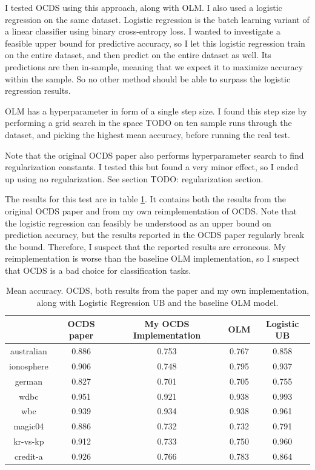 I tested OCDS using this approach, along with OLM. I also used a logistic
regression on the same dataset. Logistic regression is the batch learning
variant of a linear classifier using binary cross-entropy loss. I wanted to
investigate a feasible upper bound for predictive accuracy, so I let this
logistic regression train on the entire dataset, and then predict on the entire
dataset as well. Its predictions are then in-sample, meaning that we expect it
to maximize accuracy within the sample. So no other method should be able to
surpass the logistic regression results.

OLM has a hyperparameter in form of a single step size. I found this step size
by performing a grid search in the space TODO on ten sample runs through the
dataset, and picking the highest mean accuracy, before running the real test.

Note that the original OCDS paper also performs hyperparameter search to find regularization constants. I tested this but found a very minor effect, so I ended up using no regularization. See section TODO: regularization section.

The results for this test are in table \ref{tab:OCDS results}. It contains both
the results from the original OCDS paper and from my own reimplementation of
OCDS. Note that the logistic regression can feasibly be understood as an upper
bound on prediction accuracy, but the results reported in the OCDS paper
regularly break the bound. Therefore, I suspect that the reported results are
erroneous. My reimplementation is worse than the baseline OLM implementation, so
I suspect that OCDS is a bad choice for classification tasks.


\begin{table}
  \begin{tabular}{c|cccc}
               & OCDS paper & My OCDS Implementation & OLM   & Logistic UB \\
    \hline \hline
    australian & 0.886      & 0.753                  & 0.767 & 0.858       \\
    ionosphere & 0.906      & 0.748                  & 0.795 & 0.937       \\
    german     & 0.827      & 0.701                  & 0.705 & 0.755       \\
    wdbc       & 0.951      & 0.921                  & 0.938 & 0.993       \\
    wbc        & 0.939      & 0.934                  & 0.938 & 0.961       \\
    magic04    & 0.886      & 0.732                  & 0.732 & 0.791       \\
    kr-vs-kp   & 0.912      & 0.733                  & 0.750 & 0.960       \\
    credit-a   & 0.926      & 0.766                  & 0.783 & 0.864       \\
  \end{tabular}
  \caption{Mean accuracy. OCDS, both results from the paper and my own implementation, along with Logistic Regression UB and the baseline OLM model.}
  \label{tab:OCDS results}
\end{table}


